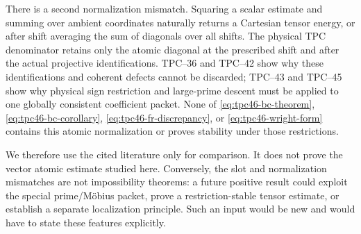 There is a second normalization mismatch.  Squaring a scalar estimate
and summing over ambient coordinates naturally returns a Cartesian
tensor energy, or after shift averaging the sum of diagonals over all
shifts.  The physical TPC denominator retains only the atomic diagonal
at the prescribed shift and after the actual projective identifications.
TPC--36 and TPC--42 show why these identifications and coherent defects
cannot be discarded; TPC--43 and TPC--45 show why physical sign
restriction and large-prime descent must be applied to one globally
consistent coefficient packet.  None of
\eqref{eq:tpc46-bc-theorem}, \eqref{eq:tpc46-bc-corollary},
\eqref{eq:tpc46-fr-discrepancy}, or \eqref{eq:tpc46-wright-form}
contains this atomic normalization or proves stability under those
restrictions.

We therefore use the cited literature only for comparison.  It does
not prove the vector atomic estimate studied here.  Conversely, the
slot and normalization mismatches are not impossibility theorems: a
future positive result could exploit the special prime/M\"obius packet,
prove a restriction-stable tensor estimate, or establish a separate
localization principle.  Such an input would be new and would have to
state these features explicitly.
